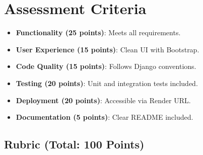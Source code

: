 \documentclass{article}
\begin{document}
\section{Assessment Criteria}
\begin{itemize}
    \item \textbf{Functionality (25 points)}: Meets all requirements.
    \item \textbf{User Experience (15 points)}: Clean UI with Bootstrap.
    \item \textbf{Code Quality (15 points)}: Follows Django conventions.
    \item \textbf{Testing (20 points)}: Unit and integration tests included.
    \item \textbf{Deployment (20 points)}: Accessible via Render URL.
    \item \textbf{Documentation (5 points)}: Clear README included.
\end{itemize}
\newpage 
\subsection{Rubric (Total: 100 Points)}
\end{document}
